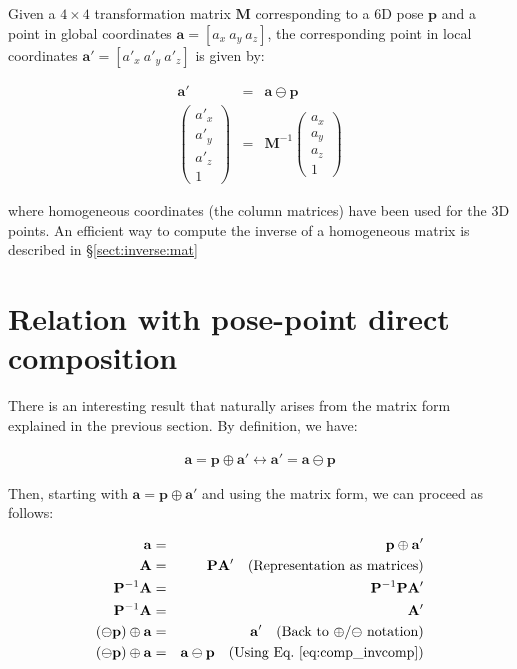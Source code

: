\documentclass[a4paper,11pt]{report}
\begin{document}
Given a $4\times 4$ transformation matrix $\mathbf{M}$ corresponding to a 6D pose
$\mathbf{p}$ and a point in global coordinates
$\mathbf{a} = [a_x ~ a_y ~ a_z]$, the corresponding point in local coordinates
$\mathbf{a'} = [a'_x ~ a'_y ~ a'_z]$ is given by:

\begin{eqnarray}
\mathbf{a'} &=& \mathbf{a} \ominus \mathbf{p} \nonumber \\
\left(\begin{array}{c}
 a'_x \\ a'_y \\ a'_z \\ 1
\end{array}\right)
&=&
\mathbf{M}^{-1}
\left(\begin{array}{c}
 a_x \\ a_y \\ a_z \\ 1
\end{array}\right)
\end{eqnarray}

\noindent where homogeneous coordinates (the column matrices) have been used for the 3D points.
An efficient way to compute the inverse of a homogeneous matrix is
described in \S \ref{sect:inverse:mat}


\section{Relation with pose-point direct composition}

There is an interesting result that naturally arises from the matrix form
explained in the previous section.
By definition, we have:

\begin{eqnarray}
 \mathbf{a} = \mathbf{p} \oplus \mathbf{a'}
\leftrightarrow
 \mathbf{a'} = \mathbf{a} \ominus \mathbf{p}
\label{eq:comp_invcomp}
\end{eqnarray}

Then, starting with $\mathbf{a} = \mathbf{p} \oplus \mathbf{a'}$
and using the matrix form, we can proceed as follows:

\begin{eqnarray*}
 \mathbf{a} &=& \mathbf{p} \oplus \mathbf{a'}    \\
 \mathbf{A} &=& \mathbf{P}  \mathbf{A'}  \quad \text{(Representation as matrices)}  \\
 \mathbf{P}^{-1} \mathbf{A} &=& \mathbf{P}^{-1} \mathbf{P}  \mathbf{A'} \\
 \mathbf{P}^{-1} \mathbf{A} &=& \mathbf{A'}  \\
 (\ominus \mathbf{p}) \oplus \mathbf{a} &=& \mathbf{a'}  \quad \text{(Back to $\oplus$/$\ominus$ notation)} \\
 (\ominus \mathbf{p}) \oplus \mathbf{a} &=& \mathbf{a} \ominus \mathbf{p}  \quad \text{(Using Eq.~\ref{eq:comp_invcomp})}
\end{eqnarray*}
\end{document}
